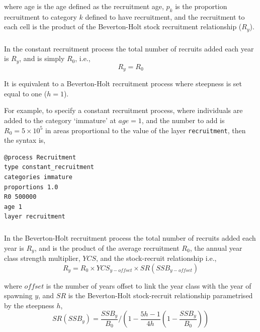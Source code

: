 where age is the age defined as the recruitment age, $p_k$ is the proportion recruitment to category $k$ defined to have recruitment, and the recruitment to each cell is the product of the Beverton-Holt stock recruitment relationship ($R_y$). 

\subsubsection*{}

In the constant recruitment process the total number of recruits added each year is $R_y$, and is simply $R_0$, i.e.,
\begin{equation}
  R_y = R_0
\end{equation}

It is equivalent to a Beverton-Holt recruitment process where steepness is set equal to one ($h=1$).

For example, to specify a constant recruitment process, where individuals are added to the category `immature' at $age=1$, and the number to add is $R_0=5 \times 10^5$ in areas proportional to the value of the layer \texttt{recruitment}, then the syntax is,

{\small{\begin{verbatim}
@process Recruitment
type constant_recruitment
categories immature
proportions 1.0
R0 500000
age 1
layer recruitment
\end{verbatim}}}

\subsubsection*{}

In the Beverton-Holt recruitment process the total number of recruits added each year is $R_y$, and is the product of the average recruitment $R_0$, the annual year class strength multiplier, $YCS$, and the stock-recruit relationship i.e.,
\begin{equation}
  R_y = R_0 \times YCS_{y-offset} \times SR(SSB_{y-offset})
\end{equation}
  
where $offset$ is the number of years offset to link the year class with the year of spawning $y$, and $SR$ is the Beverton-Holt stock-recruit relationship parametrised by the steepness $h$,
\begin{equation}
SR(SSB_y) = \frac{SSB_y}{B_0} / \left( 1-\frac{5h-1}{4h} \left( 1-\frac{SSB_y}{B_0} \right) \right)
\end{equation}

